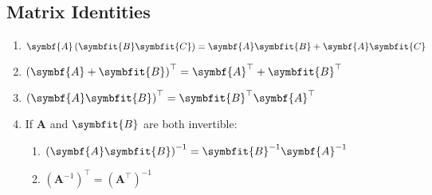 \documentclass{article}
\begin{document}
\begin{multicols*}{2}
    \section*{Matrix Identities}
    \begin{enumerate}
        \item \(\symbf{A}\left( \symbfit{B}\symbfit{C} \right) = \symbf{A}\symbfit{B}+\symbf{A}\symbfit{C}\)
        \item \(\left( \symbf{A}+\symbfit{B} \right)^\top = \symbf{A}^\top + \symbfit{B}^\top\)
        \item \(\left( \symbf{A}\symbfit{B} \right)^\top = \symbfit{B}^\top \symbf{A}^\top\)
        \item If \(\symbf{A}\) and \(\symbfit{B}\) are both invertible:
              \begin{enumerate}
                  \item \(\left( \symbf{A}\symbfit{B} \right)^{-1} = \symbfit{B}^{-1}\symbf{A}^{-1}\)
                  \item \(\left( \symbf{A}^{-1} \right)^\top = \left( \symbf{A}^\top \right)^{-1}\)
              \end{enumerate}
    \end{enumerate}
\end{multicols*}
\end{document}

